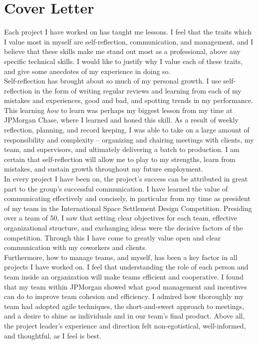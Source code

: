 \documentclass{article}
\begin{document}
\section{Cover Letter}

Each project I have worked on has taught me lessons. I feel that the traits
which I value most in myself are self-reflection, communication, and
management, and I believe that these skills make me stand out most as a
professional, above any specific technical skills. I would like to justify why
I value each of these traits, and give some anecdotes of my experience in doing
so.\\

Self-reflection has brought about so much of my personal growth.
I use self-reflection in the form of writing regular reviews and learning
from each of my mistakes and experiences, good and bad, and spotting trends in
my performance. This learning \textit{how} to learn was perhaps
my biggest lesson from my time at JPMorgan Chase, where I learned and honed
this skill. As a result of weekly reflection, planning, and record keeping, I
was able to take on a large amount of responsibility and complexity --
organizing and chairing meetings with clients, my team, and supervisors, and
ultimately delivering a batch to production. I am certain that self-reflection
will allow me to play to my strengths, learn from mistakes, and sustain growth
throughout my future employment.\\

In every project I have been on, the project's success can be attributed in
great part to the group's successful communication. I have learned the value of
communicating effectively and concisely, in particular from my time as
president of my team in the International Space Settlement Design Competition.
Presiding over a team of 50, I saw that setting clear objectives for each team,
effective organizational structure, and exchanging ideas were the decisive
factors of the competition. Through this I have come to greatly value open and
clear communication with my coworkers and clients.\\

Furthermore, how to manage teams, and myself, has been a key factor in all
projects I have worked on. I feel that understanding the role of each person
and team inside an organization will make teams efficient and cooperative.
I found that my team within JPMorgan showed what good management and incentives
can do to improve team cohesion and efficiency. I admired how thoroughly my
team had adopted agile techniques, the short-and-sweet approach to meetings,
and a desire to shine as individuals and in our team's final product. Above
all, the project leader's experience and direction felt non-egotistical,
well-informed, and thoughtful, as I feel is best.\\
\end{document}
